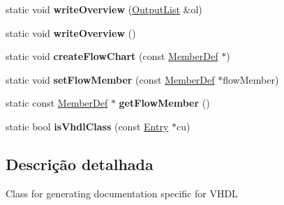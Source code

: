 \begin{DoxyCompactItemize}
\item 
\hypertarget{class_vhdl_doc_gen_a6f178dbadf5248e1456903a4c0030c4b}{static void {\bfseries write\-Overview} (\hyperlink{class_output_list}{Output\-List} \&ol)}\label{class_vhdl_doc_gen_a6f178dbadf5248e1456903a4c0030c4b}

\item 
\hypertarget{class_vhdl_doc_gen_ab5d1360dd38f28df497fb2b7e8a49ac6}{static void {\bfseries write\-Overview} ()}\label{class_vhdl_doc_gen_ab5d1360dd38f28df497fb2b7e8a49ac6}

\item 
\hypertarget{class_vhdl_doc_gen_ac681cd5515228d8bb3c8935cc9db91ba}{static void {\bfseries create\-Flow\-Chart} (const \hyperlink{class_member_def}{Member\-Def} $\ast$)}\label{class_vhdl_doc_gen_ac681cd5515228d8bb3c8935cc9db91ba}

\item 
\hypertarget{class_vhdl_doc_gen_a96669058dcfe93b1094a0723e5d053f0}{static void {\bfseries set\-Flow\-Member} (const \hyperlink{class_member_def}{Member\-Def} $\ast$flow\-Member)}\label{class_vhdl_doc_gen_a96669058dcfe93b1094a0723e5d053f0}

\item 
\hypertarget{class_vhdl_doc_gen_a7928c4efbf1276db716bfe5e26325ae2}{static const \hyperlink{class_member_def}{Member\-Def} $\ast$ {\bfseries get\-Flow\-Member} ()}\label{class_vhdl_doc_gen_a7928c4efbf1276db716bfe5e26325ae2}

\item 
\hypertarget{class_vhdl_doc_gen_aa7ec88e1992f708d9bd7803df43141d4}{static bool {\bfseries is\-Vhdl\-Class} (const \hyperlink{class_entry}{Entry} $\ast$cu)}\label{class_vhdl_doc_gen_aa7ec88e1992f708d9bd7803df43141d4}

\end{DoxyCompactItemize}


\subsection{Descrição detalhada}
Class for generating documentation specific for V\-H\-D\-L 

